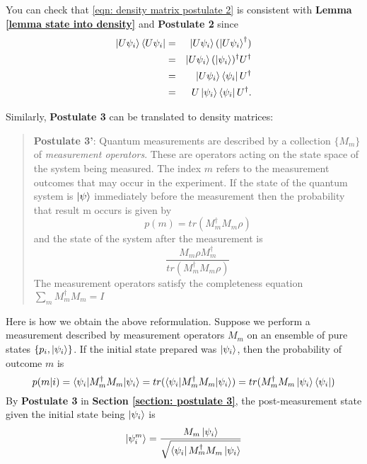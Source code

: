 You can check that \eqref{eqn: density matrix postulate 2} is consistent with \textbf{Lemma \ref{lemma state into density}} and {\bf{Postulate 2}} since
\begin{eqnarray}
\ket{U \psi_i}\bra{U \psi_i}&=& \ket{U \psi_i}(\ket{U \psi_i}^\dagger)\\
&=& \ket{U\psi_i}(\ket{\psi_i})^\dagger U^\dagger\\
&=& \ket{U \psi_i} \bra{\psi_i}U^\dagger\\
&=& U \ket{\psi_i}\bra{\psi_i}U^\dagger.
\end{eqnarray}

Similarly, \textbf{Postulate 3} can be translated to density matrices:
\begin{quote}
    \textbf{Postulate 3'}: Quantum measurements are described by a collection $\{M_m\}$ of \textit{measurement operators}. These are operators acting on the state space of the system being measured. The index $m$ refers to the measurement outcomes that may occur in the experiment. If the state of the quantum system is $\ket{\psi}$ immediately before the measurement then the probability that result m occurs is given by 
    \begin{equation}
        p(m)=tr(M_m^\dagger M_m \rho)
    \end{equation}
    and the state of the system after the measurement is
    \begin{equation}
        \frac{M_m \rho M_m^\dagger}{tr(M_m^\dagger M_m \rho)}
    \end{equation}
    The measurement operators satisfy the completeness equation $\sum_m M_m^\dagger M_m =I$
\end{quote}
Here is how we obtain the above reformulation. Suppose we perform a measurement described by measurement operators $M_m$ on an ensemble of pure states $\{p_i, \ket{\psi_i}\}$. If the initial state prepared was $\ket{\psi_i}$, then the probability of outcome $m$ is
    \begin{equation}
        p(m|i)=\braket{\psi_i|M_m^\dagger M_m|\psi_i}=tr(\braket{\psi_i|M_m^\dagger M_m|\psi_i})=tr(M_m^\dagger M_m \ket{\psi_i}\bra{\psi_i})
    \end{equation}
    By \textbf{Postulate 3} in \textbf{Section \ref{section: postulate 3}}, the post-measurement state given the initial state being $\ket{\psi_i}$ is
    \begin{equation}
        \ket{\psi_i^m}=\frac{M_m \ket{\psi_i}}{\sqrt{\bra{\psi_i}M_m^\dagger M_m \ket{\psi_i}}}
    \end{equation}
